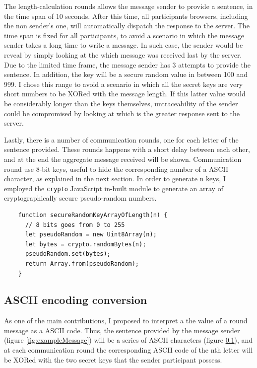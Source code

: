 The length-calculation rounds allows the message sender to provide a sentence, in the time span of 10 seconds. After this time, all participants browsers, including the non sender's one, will automatically dispatch the response to the server. The time span is fixed for all participants, to avoid a scenario in which the message sender takes a long time to write a message. In such case, the sender would be reveal by simply looking at the which message was received last by the server. Due to the limited time frame, the message sender has 3 attempts to provide the sentence. In addition, the key will be a secure random value in between 100 and 999. I chose this range to avoid a scenario in which all the secret keys are very short numbers to be XORed with the message length. If this latter value would be considerably longer than the keys themselves, untraceability of the sender could be compromised by looking at which is the greater response sent to the server. 

Lastly, there is a number of communication rounds, one for each letter of the sentence provided. These rounds happens with a short delay between each other, and at the end the aggregate message received will be shown. Communication round use 8-bit keys, useful to hide the corresponding number of a ASCII character, as explained in the next section. In order to generate n keys, I employed the \lstinline{crypto} JavaScript in-built module to generate an array of cryptographically secure pseudo-random numbers.

\begin{lstlisting}
    function secureRandomKeyArrayOfLength(n) {
      // 8 bits goes from 0 to 255
      let pseudoRandom = new Uint8Array(n);
      let bytes = crypto.randomBytes(n);
      pseudoRandom.set(bytes);
      return Array.from(pseudoRandom);
    }
\end{lstlisting}


\subsection{ASCII encoding conversion}
As one of the main contributions, I proposed to interpret a the value of a round message as a ASCII code. Thus, the sentence provided by the message sender (figure \ref{fig:exampleMessage}) will be a series of ASCII characters (figure \ref{}), and at each communication round the corresponding ASCII code of the nth letter will be XORed with the two secret keys that the sender participant possess.

